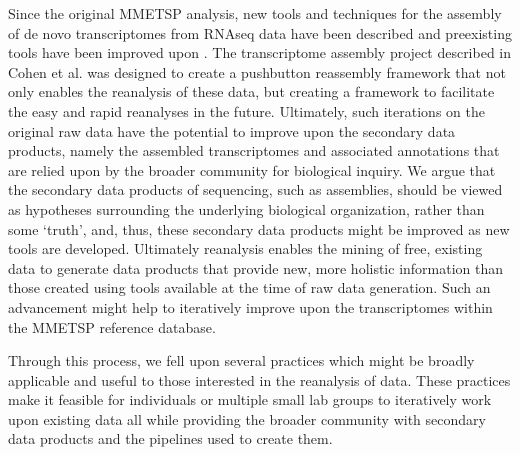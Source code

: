 \documentclass[12pt]{article}
\begin{document}
Since the original MMETSP analysis, new tools and techniques for the assembly of de novo transcriptomes from RNAseq data have been described and preexisting tools have been improved upon \cite{Grabherr2011}. The transcriptome assembly project described in Cohen et al. \cite{Cohen2017} was designed to create a pushbutton reassembly framework that not only enables the reanalysis of these data, but creating a framework to facilitate the easy and rapid reanalyses in the future. Ultimately, such iterations on the original raw data have the potential to improve upon the secondary data products, namely the assembled transcriptomes and associated annotations that are relied upon by the broader community for biological inquiry. We argue that the secondary data products of sequencing, such as assemblies, should be viewed as hypotheses surrounding the underlying biological organization, rather than some `truth', and, thus, these secondary data products might be improved as new tools are developed. Ultimately reanalysis enables the mining of free, existing data to generate data products that provide new, more holistic information than those created using tools available at the time of raw data generation. Such an advancement might help to iteratively improve upon the transcriptomes within the MMETSP reference database.

Through this process, we fell upon several practices which might be broadly applicable and useful to those interested in the reanalysis of data. These practices make it feasible for individuals or multiple small lab groups to iteratively work upon existing data all while providing the broader community with secondary data products and the pipelines used to create them. %

\end{document}
